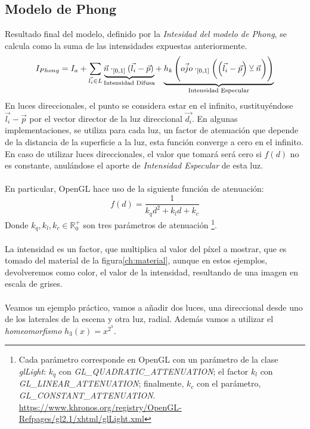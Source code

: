 \subsection{Modelo de Phong}
Resultado final del modelo, definido por la \textit{Intesidad del modelo de Phong}, se calcula como la suma de las intensidades expuestas anteriormente.
\[I_{Phong}=I_a+\sum_{\Vec{l_i}\in L} \mathrlap{\underbrace{\phantom{\Vec{n}\cdot_{[0, 1]}(\Vec{l_i}-\Vec{p})}}_{\text{Intensidad Difusa}}}\Vec{n}\cdot_{[0, 1]}(\Vec{l_i}-\Vec{p}) + \mathrlap{\underbrace{\phantom{h_k\left(\Vec{ojo}\cdot_{[0, 1]}\left(\left(\Vec{l_i}-\Vec{p}\right) \veebar \Vec{n}\right)\right)}}_{\text{Intensidad Especular}}}h_k\left(\Vec{ojo}\cdot_{[0, 1]}\left(\left(\Vec{l_i}-\Vec{p}\right) \veebar \Vec{n}\right)\right)\]
En luces direccionales, el punto se considera estar en el infinito, sustituyéndose \(\Vec{l_i}-\Vec{p}\) por el vector director de la luz direccional \(\Vec{d_i}\). En algunas implementaciones, se utiliza para cada luz, un factor de atenuación que depende de la distancia de la superficie a la luz, esta función converge a cero en el infinito. En caso de utilizar luces direccionales, el valor que tomará  será cero si \(f(d)\) no es constante, anulándose el aporte de \textit{Intensidad Especular} de esta luz.\\\\En particular, OpenGL hace uso de la siguiente función de atenuación:
\[f(d)=\dfrac{1}{k_qd^2+k_ld+k_c}\]
Donde \(k_q,k_l,k_c \in \mathbb{R}^{+}_{0}\) son tres parámetros de atenuación \footnote{Cada parámetro corresponde en OpenGL con un parámetro de la clase \textit{glLight}: \(k_q\) con \textit{GL\_QUADRATIC\_ATTENUATION}; el factor \(k_l\) con \textit{GL\_LINEAR\_ATTENUATION}; finalmente, \(k_c\) con el parámetro, \textit{GL\_CONSTANT\_ATTENUATION}. \url{https://www.khronos.org/registry/OpenGL-Refpages/gl2.1/xhtml/glLight.xml}}.\\\\
La intensidad es un factor, que multiplica al valor del píxel a mostrar, que es tomado del material de la figura\ref{ch:material}, aunque en estos ejemplos, devolveremos como color, el valor de la intensidad, resultando de una imagen en escala de grises.\\\\
Veamos un ejemplo práctico, vamos a añadir dos luces, una direccional desde uno de los laterales de la escena y otra luz, radial. Además vamos a utilizar el \textit{homeomorfismo} \(h_3(x)=x^{2^3}\).\\

